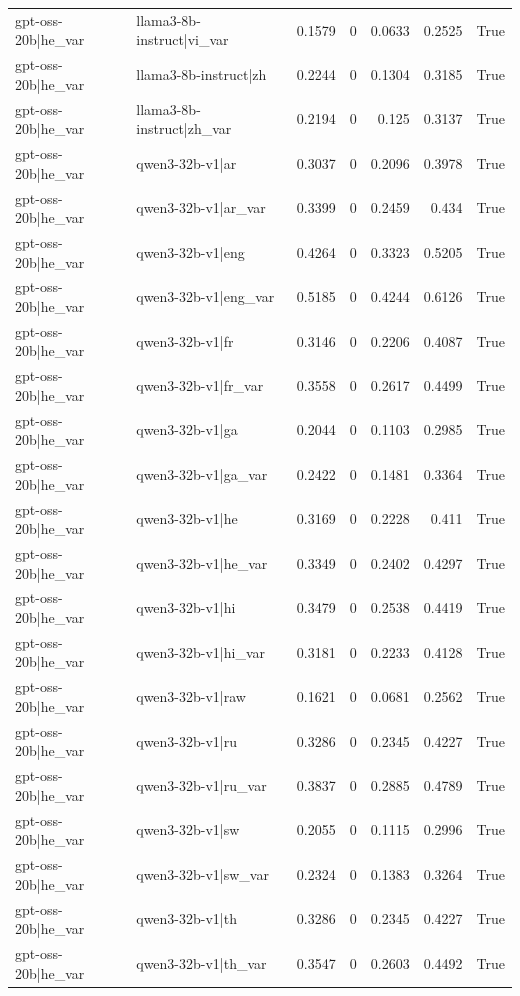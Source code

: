 \begin{table}
\begin{tabular}{l l r r r r l}
gpt-oss-20b|he_var & llama3-8b-instruct|vi_var & 0.1579 & 0 & 0.0633 & 0.2525 & True \\
gpt-oss-20b|he_var & llama3-8b-instruct|zh & 0.2244 & 0 & 0.1304 & 0.3185 & True \\
gpt-oss-20b|he_var & llama3-8b-instruct|zh_var & 0.2194 & 0 & 0.125 & 0.3137 & True \\
gpt-oss-20b|he_var & qwen3-32b-v1|ar & 0.3037 & 0 & 0.2096 & 0.3978 & True \\
gpt-oss-20b|he_var & qwen3-32b-v1|ar_var & 0.3399 & 0 & 0.2459 & 0.434 & True \\
gpt-oss-20b|he_var & qwen3-32b-v1|eng & 0.4264 & 0 & 0.3323 & 0.5205 & True \\
gpt-oss-20b|he_var & qwen3-32b-v1|eng_var & 0.5185 & 0 & 0.4244 & 0.6126 & True \\
gpt-oss-20b|he_var & qwen3-32b-v1|fr & 0.3146 & 0 & 0.2206 & 0.4087 & True \\
gpt-oss-20b|he_var & qwen3-32b-v1|fr_var & 0.3558 & 0 & 0.2617 & 0.4499 & True \\
gpt-oss-20b|he_var & qwen3-32b-v1|ga & 0.2044 & 0 & 0.1103 & 0.2985 & True \\
gpt-oss-20b|he_var & qwen3-32b-v1|ga_var & 0.2422 & 0 & 0.1481 & 0.3364 & True \\
gpt-oss-20b|he_var & qwen3-32b-v1|he & 0.3169 & 0 & 0.2228 & 0.411 & True \\
gpt-oss-20b|he_var & qwen3-32b-v1|he_var & 0.3349 & 0 & 0.2402 & 0.4297 & True \\
gpt-oss-20b|he_var & qwen3-32b-v1|hi & 0.3479 & 0 & 0.2538 & 0.4419 & True \\
gpt-oss-20b|he_var & qwen3-32b-v1|hi_var & 0.3181 & 0 & 0.2233 & 0.4128 & True \\
gpt-oss-20b|he_var & qwen3-32b-v1|raw & 0.1621 & 0 & 0.0681 & 0.2562 & True \\
gpt-oss-20b|he_var & qwen3-32b-v1|ru & 0.3286 & 0 & 0.2345 & 0.4227 & True \\
gpt-oss-20b|he_var & qwen3-32b-v1|ru_var & 0.3837 & 0 & 0.2885 & 0.4789 & True \\
gpt-oss-20b|he_var & qwen3-32b-v1|sw & 0.2055 & 0 & 0.1115 & 0.2996 & True \\
gpt-oss-20b|he_var & qwen3-32b-v1|sw_var & 0.2324 & 0 & 0.1383 & 0.3264 & True \\
gpt-oss-20b|he_var & qwen3-32b-v1|th & 0.3286 & 0 & 0.2345 & 0.4227 & True \\
gpt-oss-20b|he_var & qwen3-32b-v1|th_var & 0.3547 & 0 & 0.2603 & 0.4492 & True \\

\end{tabular}
\end{table}
